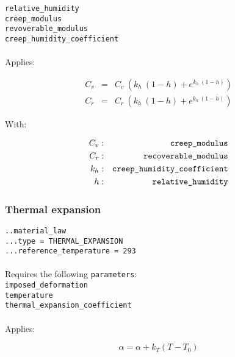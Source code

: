 \documentclass[10pt]{article}
\begin{document}
\noindent \verb+relative_humidity+\\
\verb+creep_modulus+\\
\verb+revoverable_modulus+\\
\verb+creep_humidity_coefficient+

\paragraph{}Applies:

\begin{eqnarray}
	C_v & = & C_v\ \left(k_h\ (1-h) + e^{k_h\ (1-h)} \right) \\
	C_r & = & C_r\ \left(k_h\ (1-h) + e^{k_h\ (1-h)} \right) 
\end{eqnarray}

With:

\begin{eqnarray}
	C_v & : & \verb+creep_modulus+ \notag \\
	C_r & : & \verb+recoverable_modulus+ \notag \\
	k_h & : & \verb+creep_humidity_coefficient+\notag  \\
	h & : & \verb+relative_humidity+ \notag 
\end{eqnarray}

\subsubsection{Thermal expansion}

\noindent \verb+..material_law+\\
\verb+...type = THERMAL_EXPANSION+\\
\verb+...reference_temperature = 293+

\paragraph{}Requires the following \verb+parameters+:\\

\noindent \verb+imposed_deformation+\\
\verb+temperature+\\
\verb+thermal_expansion_coefficient+

\paragraph{}Applies:

\begin{equation}
	\alpha = \alpha + k_T ( T - T_0 )
\end{equation}
\end{document}
